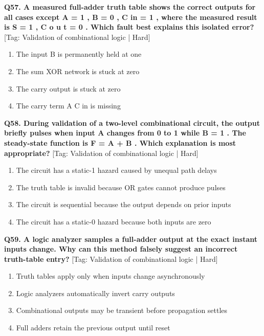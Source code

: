 \noindent\textbf{Q57. A measured full-adder truth table shows the correct outputs for all cases except A = 1 , B = 0 , C in = 1 , where the measured result is S = 1 , C o u t = 0 . Which fault best explains this isolated error?} \hfill [Tag: Validation of combinational logic | Hard]
\begin{enumerate}[label=(\alph*),topsep=2pt,itemsep=1pt,partopsep=0pt,parsep=0pt]
    \item {The input B is permanently held at one}
    \item {The sum XOR network is stuck at zero}
    \item {The carry output is stuck at zero}
    \item {The carry term A C in is missing}
\end{enumerate}
\vspace{2mm}

\noindent\textbf{Q58. During validation of a two-level combinational circuit, the output briefly pulses when input A changes from 0 to 1 while B = 1 . The steady-state function is F = A + B . Which explanation is most appropriate?} \hfill [Tag: Validation of combinational logic | Hard]
\begin{enumerate}[label=(\alph*),topsep=2pt,itemsep=1pt,partopsep=0pt,parsep=0pt]
    \item {The circuit has a static-1 hazard caused by unequal path delays}
    \item {The truth table is invalid because OR gates cannot produce pulses}
    \item {The circuit is sequential because the output depends on prior inputs}
    \item {The circuit has a static-0 hazard because both inputs are zero}
\end{enumerate}
\vspace{2mm}

\noindent\textbf{Q59. A logic analyzer samples a full-adder output at the exact instant inputs change. Why can this method falsely suggest an incorrect truth-table entry?} \hfill [Tag: Validation of combinational logic | Hard]
\begin{enumerate}[label=(\alph*),topsep=2pt,itemsep=1pt,partopsep=0pt,parsep=0pt]
    \item {Truth tables apply only when inputs change asynchronously}
    \item {Logic analyzers automatically invert carry outputs}
    \item {Combinational outputs may be transient before propagation settles}
    \item {Full adders retain the previous output until reset}
\end{enumerate}
\vspace{2mm}


